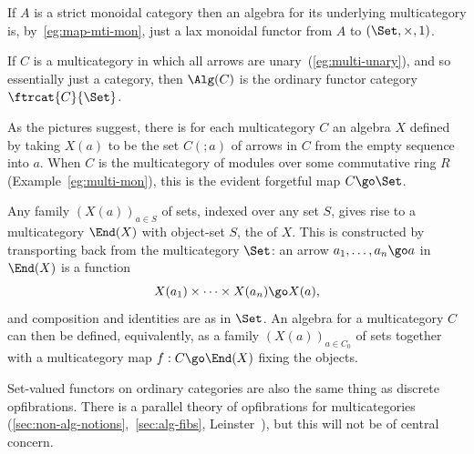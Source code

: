 \begin{example}	
If $A$ is a strict monoidal category then an algebra for its underlying
multicategory is, by~\ref{eg:map-mti-mon}, just a lax monoidal functor from
$A$ to $(\Set, \times, 1)$.
\end{example}

\begin{example}	
If $C$ is a multicategory in which all arrows are
unary~(\ref{eg:multi-unary}), and so essentially just a category, then
$\Alg(C)$ is the ordinary functor category $\ftrcat{C}{\Set}$.
\end{example}

\begin{example}	
As the pictures suggest, there is for each multicategory $C$ an algebra $X$
defined by taking $X(a)$ to be the set $C(;a)$ of arrows in $C$ from the
empty sequence into $a$.  When $C$ is the multicategory of modules%
%
%
over
some commutative ring $R$ (Example~\ref{eg:multi-mon}), this is the evident
forgetful map $C \go \Set$.
\end{example}

\begin{example}	
Any family $(X(a))_{a\in S}$ of sets, indexed over any set $S$, gives rise
to a multicategory $\End(X)$%
% 
% 
with object-set $S$, the  of $X$.  This
is constructed by transporting back from the multicategory $\Set$: an arrow
$a_1, \ldots, a_n \go a$ in $\End(X)$ is a function
\[
X(a_1) \times\cdots\times X(a_n) \go X(a),
\]
and composition and identities are as in $\Set$.  An algebra%
%
%
%
for a
multicategory $C$ can then be defined, equivalently, as a family
$(X(a))_{a\in C_0}$ of sets together with a multicategory map $f: C \go
\End(X)$ fixing the objects.
\end{example}


Set-valued functors on ordinary categories are also the same thing as
discrete opfibrations.%
%
%
 There is a parallel theory of opfibrations for
multicategories (\ref{sec:non-alg-notions},~\ref{sec:alg-fibs},
Leinster~\cite{FM}), but this will not be of central concern.




